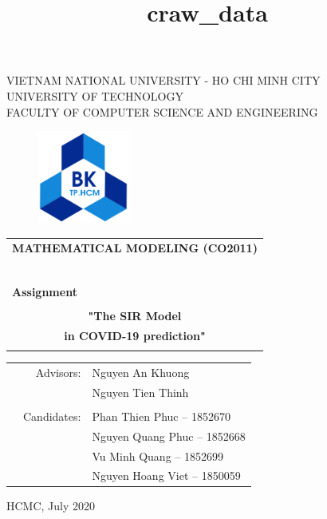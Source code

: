 \documentclass[a4paper]{article}
\title{craw\_data}
\begin{document}
\begin{titlepage}
\begin{center}
VIETNAM NATIONAL UNIVERSITY - HO CHI MINH CITY \\
UNIVERSITY OF TECHNOLOGY \\
FACULTY OF COMPUTER SCIENCE AND ENGINEERING
\end{center}

\vspace{1cm}

\begin{figure}[h!]
\begin{center}
\includegraphics[width=3cm]{Images/hcmut.png}
\end{center}
\end{figure}

\vspace{1cm}


\begin{center}
\begin{tabular}{c}
\multicolumn{1}{l}{\textbf{{\Large MATHEMATICAL MODELING (CO2011)}}}\\
~~\\
\hline
\\
\multicolumn{1}{l}{\textbf{{\Large Assignment}}}\\
\\
\textbf{{\Huge "The SIR Model}} \\
\textbf{{\Huge in COVID-19 prediction"}}\\
\\
\hline
\end{tabular}
\end{center}

\vspace{1.5cm}

\begin{table}[h]
\begin{tabular}{rrl}
\hspace{5 cm} & Advisors: & Nguyen An Khuong\\
\hspace{5 cm} &  & Nguyen Tien Thinh\\
\\
& Candidates: & Phan Thien Phuc -- 1852670 \\
& & Nguyen Quang Phuc -- 1852668 \\
& & Vu Minh Quang -- 1852699 \\
& & Nguyen Hoang Viet -- 1850059 \\
\end{tabular}
\end{table}
\vspace{1.5cm}
\begin{center}
{\footnotesize HCMC, July 2020}
\end{center}
\end{titlepage}
\end{document}
